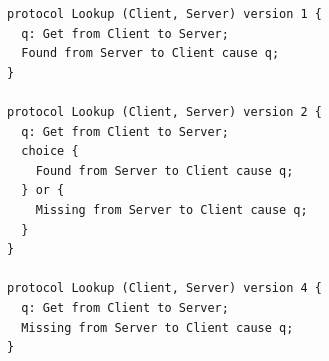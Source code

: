 \begin{lstlisting}[language={},basicstyle=\ttfamily\scriptsize,breaklines=true]
protocol Lookup (Client, Server) version 1 {
  q: Get from Client to Server;
  Found from Server to Client cause q;
}

protocol Lookup (Client, Server) version 2 {
  q: Get from Client to Server;
  choice {
    Found from Server to Client cause q;
  } or {
    Missing from Server to Client cause q;
  }
}

protocol Lookup (Client, Server) version 4 {
  q: Get from Client to Server;
  Missing from Server to Client cause q;
}
\end{lstlisting}
